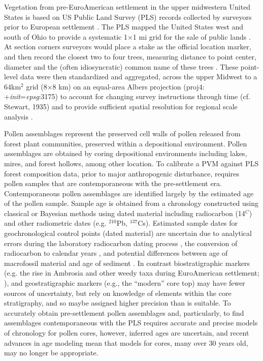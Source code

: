 \documentclass[12pt]{article}
\begin{document}
Vegetation from pre-EuroAmerican settlement in the upper midwestern
United States is based on US Public Land Survey (PLS) records
collected by surveyors prior to European settlement
\citep{bourdo1956review, schulte2001original,
  almendinger1996minnesota}. The PLS mapped the United States west and
south of Ohio to provide a systematic 1$\times$1 mi grid for the sale
of public lands \citep{stewart1935public, white1983history}. At
section corners surveyors would place a stake as the official location
marker, and then record the closest two to four trees, measuring
distance to point center, diameter and the (often idiosyncratic)
common name of these trees \citep{mladenoff2002narrowing}.  These
point-level data were then standardized and aggregated, across the
upper Midwest to a 64km$^2$ grid (8$\times$8 km) on an equal-area
Albers projection (proj4: +\textit{init}=\textit{epsg}:3175) to
account for changing survey instructions through time (cf. Stewart,
1935) and to provide sufficient spatial resolution for regional scale
analysis \citep{goring2015b}.

Pollen assemblages represent the preserved cell walls of pollen
released from forest plant communities, preserved within a
depositional environment.  Pollen assemblages are obtained by coring
depositional environments including lakes, mires, and forest hollows,
among other location. To calibrate a PVM against PLS forest
composition data, prior to major anthropogenic disturbance, requires
pollen samples that are contemporaneous with the pre-settlement
era. Contemporaneous pollen assemblages are identified largely by the
estimated age of the pollen sample. Sample age is obtained from a
chronology constructed using classical \citep{blaauw2010methods} or
Bayesian \citep{blaauw2011flexible, buck1999bcal,
  blaauw2005radiocarbon, ramsey1995radiocarbon} methods using dated
material including radiocarbon (14$^C$) and other radiometric dates
(e.g. $^{210}$Pb, $^137$Cs). Estimated sample dates for
geochronological control points (dated material) are uncertain due to
analytical errors during the laboratory radiocarbon dating process
\citep{ward1978procedures}, the conversion of radiocarbon to calendar
years \citep{reimer2013intcal13}, and potential differences between
age of macrofossil material and age of sediment
\citep{blois2011methodological}. In contrast biostratigraphic markers
(e.g. the rise in Ambrosia and other weedy taxa during EuroAmerican
settlement; \citet{mcandrews1988human}), and geostratigraphic markers
(e.g., the ``modern'' core top) may have fewer sources of uncertainty,
but rely on knowledge of elements within the core stratigraphy, and so
maybe assigned higher precision than is suitable. To accurately obtain
pre-settlement pollen assemblages and, particularly, to find
assemblages contemporaneous with the PLS requires accurate and precise
models of chronology for pollen cores, however, inferred ages are
uncertain, and recent advances in age modeling mean that models for
cores, many over 30 years old, may no longer be appropriate.
\end{document}
